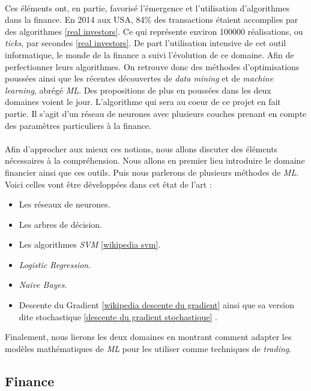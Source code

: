 \documentclass[a4paper, 11pt]{article}
\begin{document}
\paragraph{}
Ces éléments ont, en partie, favorisé l'émergence et l'utilisation d'algorithmes dans la finance. En 2014 aux USA, 84\% des transactions étaient accomplies par des algorithmes \ref{real investors}. Ce qui représente environ 100000 réalisations, ou \textit{ticks}, par secondes \ref{real investors}.
De part l'utilisation intensive de cet outil informatique, le monde de la finance a suivi l'évolution de ce domaine. Afin de perfectionner leurs algorithmes.
On retrouve donc des méthodes d'optimisations poussées ainsi que les récentes découvertes de \textit{data mining} et de \textit{machine learning}, abrégé \textit{ML}. Des propositions de plus en poussées dans les deux domaines voient le jour. L'algorithme qui sera au coeur de ce projet en fait partie. Il s'agit d'un réseau de neurones avec plusieurs couches prenant en compte des paramètres particuliers à la finance.

\paragraph{}Afin d'approcher aux mieux ces notions, nous allons discuter des éléments nécessaires à la compréhension.
Nous allons en premier lieu introduire le domaine financier ainsi que ces outils. Puis nous parlerons de plusieurs méthodes de \textit{ML}.
Voici celles vont être développées dans cet état de l'art :
\begin{itemize}
\item Les réseaux de neurones.
\item Les arbres de décision.
\item Les algorithmes \textit{SVM} \ref{wikipedia svm}.
\item \textit{Logistic Regression}.
\item \textit{Naive Bayes}.
\item Descente du Gradient \ref{wikipedia descente du gradient} ainsi que sa version dite stochastique \ref{descente du gradient stochastique} .
\end{itemize}

Finalement, nous lierons les deux domaines en montrant comment adapter les modèles mathématiques de \textit{ML} pour les utiliser comme techniques de \textit{trading}.


\subsection{Finance}
\end{document}
